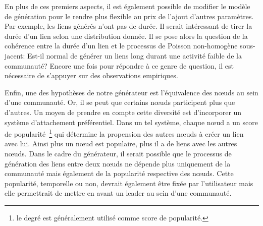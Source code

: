 En plus de ces premiers aspects, il est également possible de modifier le modèle de génération pour le rendre plus flexible au prix de l'ajout d'autres paramètres.
Par exemple, les liens générés n'ont pas de durée.
Il serait intéressant de tirer la durée d'un lien selon une distribution donnée.
Il se pose alors la question de la cohérence entre la durée d'un lien et le processus de Poisson non-homogène sous-jacent: Est-il normal de générer un liens long durant une activité faible de la communauté?
Encore une fois pour répondre à ce genre de question, il est nécessaire de s'appuyer sur des observations empiriques.

Enfin, une des hypothèses de notre générateur est l'équivalence des n\oe uds au sein d'une communauté.
Or, il se peut que certains n\oe uds participent plus que d'autres.
Un moyen de prendre en compte cette diversité est d'incorporer un système d'attachement préférentiel.
Dans un tel système, chaque n\oe ud a un score de popularité~\footnote{le degré est généralement utilisé comme score de popularité.} qui détermine la propension des autres n\oe uds à créer un lien avec lui.
Ainsi plus un n\oe ud est populaire, plus il a de liens avec les autres n\oe uds.
Dans le cadre du générateur, il serait possible que le processus de génération des liens entre deux n\oe uds ne dépende plus uniquement de la communauté mais également de la popularité respective des n\oe uds.
Cette popularité, temporelle ou non, devrait également être fixée par l'utilisateur mais elle permettrait de mettre en avant un leader au sein d'une communauté.





